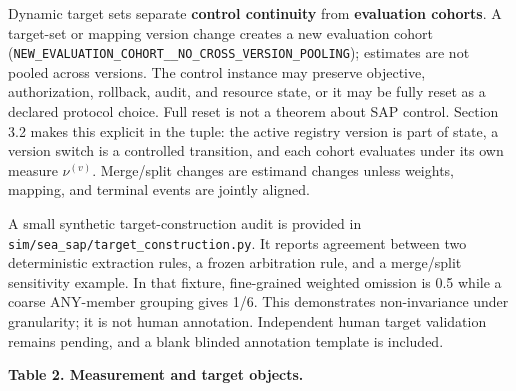 \documentclass[
  11pt]{article}
\begin{document}
Dynamic target sets separate \textbf{control continuity} from
\textbf{evaluation cohorts}. A target-set or mapping version change
creates a new evaluation cohort
(\texttt{NEW\_EVALUATION\_COHORT\_\_NO\_CROSS\_VERSION\_POOLING});
estimates are not pooled across versions. The control instance may
preserve objective, authorization, rollback, audit, and resource state,
or it may be fully reset as a declared protocol choice. Full reset is
not a theorem about SAP control. Section 3.2 makes this explicit in the
tuple: the active registry version is part of state, a version switch is
a controlled transition, and each cohort evaluates under its own measure
\(\nu^{(v)}\). Merge/split changes are estimand changes unless weights,
mapping, and terminal events are jointly aligned.

A small synthetic target-construction audit is provided in
\texttt{sim/sea\_sap/target\_construction.py}. It reports agreement
between two deterministic extraction rules, a frozen arbitration rule,
and a merge/split sensitivity example. In that fixture, fine-grained
weighted omission is 0.5 while a coarse ANY-member grouping gives 1/6.
This demonstrates non-invariance under granularity; it is not human
annotation. Independent human target validation remains pending, and a
blank blinded annotation template is included.

\textbf{Table 2. Measurement and target objects.}
\end{document}
